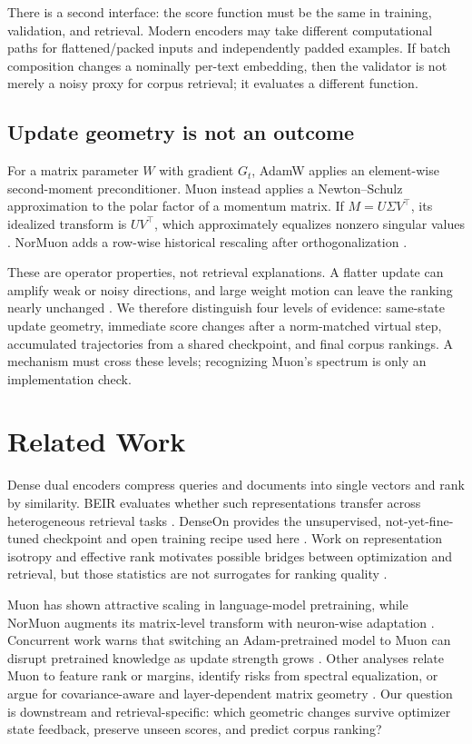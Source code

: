 \documentclass[11pt]{article}
\begin{document}
There is a second interface: the score function must be the same in training, validation, and
retrieval. Modern encoders may take different computational paths for flattened/packed inputs and
independently padded examples. If batch composition changes a nominally per-text embedding, then
the validator is not merely a noisy proxy for corpus retrieval; it evaluates a different function.

\subsection{Update geometry is not an outcome}

For a matrix parameter $W$ with gradient $G_t$, AdamW applies an element-wise second-moment
preconditioner. Muon instead applies a Newton--Schulz approximation to the polar factor of a momentum
matrix. If $M=U\Sigma V^\top$, its idealized transform is $UV^\top$, which approximately equalizes
nonzero singular values \citep{jordan2024muon}. NorMuon adds a row-wise historical rescaling after
orthogonalization \citep{li2025normuon}.

These are operator properties, not retrieval explanations. A flatter update can amplify weak or
noisy directions, and large weight motion can leave the ranking nearly unchanged
\citep{pang2026htmuon,qu2026finetune}. We therefore distinguish four levels of evidence:
same-state update geometry, immediate score changes after a norm-matched virtual step, accumulated
trajectories from a shared checkpoint, and final corpus rankings. A mechanism must cross these
levels; recognizing Muon's spectrum is only an implementation check.

\section{Related Work}

Dense dual encoders compress queries and documents into single vectors and rank by similarity.
BEIR evaluates whether such representations transfer across heterogeneous retrieval tasks
\citep{thakur2021beir}. DenseOn provides the unsupervised, not-yet-fine-tuned checkpoint and open
training recipe used here \citep{sourty2026denseon}. Work on representation isotropy and effective
rank motivates possible bridges between optimization and retrieval, but those statistics are not
surrogates for ranking quality \citep{kim2024hil}.

Muon has shown attractive scaling in language-model pretraining, while NorMuon augments its
matrix-level transform with neuron-wise adaptation \citep{liu2025muon,li2025normuon}. Concurrent
work warns that switching an Adam-pretrained model to Muon can disrupt pretrained knowledge as
update strength grows \citep{qu2026finetune,liu2026consistency}. Other analyses relate Muon to
feature rank or margins, identify risks from spectral equalization, or argue for covariance-aware
and layer-dependent matrix geometry \citep{ruan2026features,pang2026htmuon,du2026newtonmuon,
massena2026schatten}. Our question is downstream and retrieval-specific: which geometric changes
survive optimizer state feedback, preserve unseen scores, and predict corpus ranking?
\end{document}
